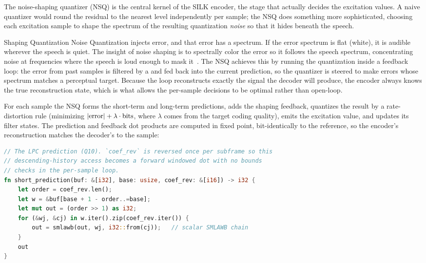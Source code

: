 The noise-shaping quantizer (NSQ) is the central kernel of the SILK encoder, the
stage that actually decides the excitation values. A naive quantizer would round
the residual to the nearest level independently per sample; the NSQ does
something more sophisticated, choosing each excitation sample to shape the
spectrum of the resulting quantization \emph{noise} so that it hides beneath the
speech.

\begin{concept}{Shaping Quantization Noise}
  Quantization injects error, and that error has a spectrum. If the error
  spectrum is flat (white), it is audible wherever the speech is quiet. The
  insight of noise shaping is to spectrally color the error so it follows the
  speech spectrum, concentrating noise at frequencies where the speech is loud
  enough to mask it~\cite{rabiner1978digital}. The NSQ achieves this by running
  the quantization inside a feedback loop: the error from past samples is
  filtered by a  and fed back into the current
  prediction, so the quantizer is steered to make errors whose
  spectrum matches a
  perceptual target. Because the loop reconstructs exactly the signal
  the decoder
  will produce, the encoder always knows the true reconstruction state, which is
  what allows the per-sample decisions to be optimal rather than open-loop.
\end{concept}

For each sample the NSQ forms the short-term and long-term predictions, adds the
shaping feedback, quantizes the result by a rate-distortion rule (minimizing
  $\lvert\text{error}\rvert + \lambda \cdot \text{bits}$, where $\lambda$
  comes from the
target coding quality), emits the excitation value, and updates its filter
states. The prediction and feedback dot products are computed in fixed point,
bit-identically to the reference, so the encoder's reconstruction matches the
decoder's to the sample:

\begin{lstlisting}[language=Rust]
// The LPC prediction (Q10). `coef_rev` is reversed once per subframe so this
// descending-history access becomes a forward windowed dot with no bounds
// checks in the per-sample loop.
fn short_prediction(buf: &[i32], base: usize, coef_rev: &[i16]) -> i32 {
    let order = coef_rev.len();
    let w = &buf[base + 1 - order..=base];
    let mut out = (order >> 1) as i32;
    for (&wj, &cj) in w.iter().zip(coef_rev.iter()) {
        out = smlawb(out, wj, i32::from(cj));   // scalar SMLAWB chain
    }
    out
}
\end{lstlisting}

